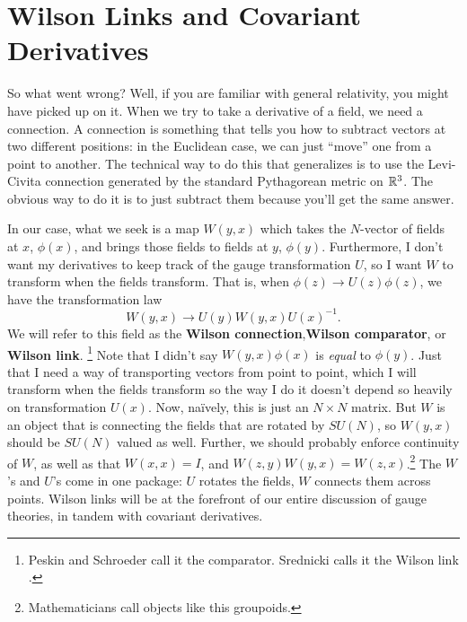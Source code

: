 \documentclass[main.tex]{subfiles}
\begin{document}
\section{Wilson Links and Covariant Derivatives}
So what went wrong? Well, if you are familiar with general relativity, you might have picked up on it. When we try to take a derivative of a field, we need a connection. A connection is something that tells you how to subtract vectors at two different positions: in the Euclidean case, we can just ``move'' one from a point to another. The technical way to do this that generalizes is to use the Levi-Civita connection generated by the standard Pythagorean metric on $\mathbb{R}^3$. The obvious way to do it is to just subtract them because you'll get the same answer. 

In our case, what we seek is a map $W(y,x)$ which takes the $N$-vector of fields at $x$, $\phi(x)$, and brings those fields to fields at $y$, $\phi(y)$. Furthermore, I don't want my derivatives to keep track of the gauge transformation $U$, so I want $W$ to transform when the fields transform. That is, when $\phi (z) \to U(z) \phi(z)$, we have the transformation law
\[
W(y,x) \to U(y) W(y,x) U(x)^{-1}.
\]
We will refer to this field as the \textbf{Wilson connection},\textbf{Wilson comparator}, or \textbf{Wilson link}. \footnote{Peskin and Schroeder call it the comparator. \cite{pas} Srednicki calls it the Wilson link \cite{sred}.} Note that I didn't say $W(y,x) \phi(x)$ is \textit{equal} to $\phi(y)$. Just that I need a way of transporting vectors from point to point, which I will transform when the fields transform so the way I do it doesn't depend so heavily on transformation $U(x)$. Now, na\"ively, this is just an $N \times N$ matrix. But $W$ is an object that is connecting the fields that are rotated by $SU(N)$, so $W(y,x)$ should be $SU(N)$ valued as well. Further, we should probably enforce continuity of $W$, as well as that $W(x,x) = I$, and $W(z,y) W(y,x) = W(z,x)$.\footnote{Mathematicians call objects like this groupoids.} The $W$'s and $U$'s come in one package: $U$ rotates the fields, $W$ connects them across points. Wilson links will be at the forefront of our entire discussion of gauge theories, in tandem with covariant derivatives. 
\end{document}
